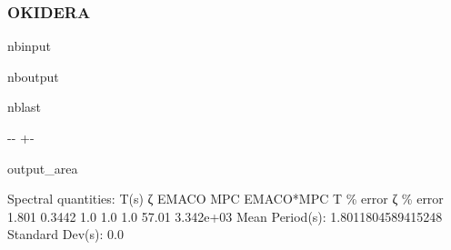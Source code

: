 \documentclass[letterpaper,10pt,english]{sphinxmanual}
\begin{document}
\subsubsection{OKID\sphinxhyphen{}ERA}
\label{\detokenize{examples/01_SISO_Intro:OKID-ERA}}
\begin{sphinxuseclass}{nbinput}
{
\begin{sphinxVerbatim}[commandchars=\\\{\}]
\llap{\color{nbsphinxin}[10]:\,\hspace{\fboxrule}\hspace{\fboxsep}}
  
\PYG{p}{[}\PYG{p}{]}       
\PYG{p}{[}\PYG{p}{]}\PYG{p}{[}\PYG{p}{]}  
\end{sphinxVerbatim}
}

\end{sphinxuseclass}
\begin{sphinxuseclass}{nboutput}
\begin{sphinxuseclass}{nblast}
{

\kern-\sphinxverbatimsmallskipamount\kern-\baselineskip
\kern+\FrameHeightAdjust\kern-\fboxrule
\vspace{\nbsphinxcodecellspacing}

\begin{sphinxuseclass}{output_area}
\begin{sphinxuseclass}{}


\begin{sphinxVerbatim}[commandchars=\\\{\}]
Spectral quantities:
       T(s)        ζ        EMACO      MPC       EMACO*MPC     T \% error    ζ \% error
      1.801      0.3442     1.0        1.0        1.0          57.01        3.342e+03
Mean Period(s): 1.8011804589415248
Standard Dev(s): 0.0
\end{sphinxVerbatim}



\end{sphinxuseclass}
\end{sphinxuseclass}
}

\end{sphinxuseclass}
\end{sphinxuseclass}
\end{document}
